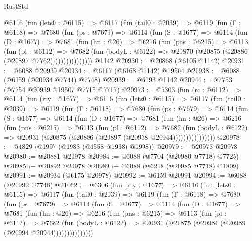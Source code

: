 \begin{lexlean}{RustStd}
\begin{coremodule}
        @6116
          (fun (lets0 : @6115) =>
          @6117
            (fun (tail0 : @2039) =>
            @6119
              (fun (Γ : @6118) =>
              @7680
                (fun (ps : @7679) =>
                @6114
                  (fun (S : @1677) =>
                  @6114
                    (fun (D : @1677) =>
                    @7681
                      (fun (hn : @26) =>
                      @6216
                        (fun (pns : @6215) =>
                        @6113
                          (fun (pl : @6112) =>
                          @7682
                            (fun (bodyL : @6122) =>
                            @20870 (@20875 (@20886 (@20897 @7762))))))))))))))))
    @1142
@20930 := @20868 (@6105 @1142)
@20931 := @6088 @20930
@20934 := @6167 (@6168 @1142) @19504
@20938 := @6088 (@6159 (@20934 @7744) @7748)
@20939 := @6193 @1142
@20944 := @7753 (@7754 @20939 @19507 @7715 @7717)
@20973 := @6303
    (fun (rc : @6112) =>
    @6114
      (fun (rty : @1677) =>
      @6116
        (fun (lets0 : @6115) =>
        @6117
          (fun (tail0 : @2039) =>
          @6119
            (fun (Γ : @6118) =>
            @7680
              (fun (ps : @7679) =>
              @6114
                (fun (S : @1677) =>
                @6114
                  (fun (D : @1677) =>
                  @7681
                    (fun (hn : @26) =>
                    @6216
                      (fun (pns : @6215) =>
                      @6113
                        (fun (pl : @6112) =>
                        @7682
                          (fun (bodyL : @6122) =>
                          @20931 (@20875 (@20886 (@20897 (@20938 @20944))))))))))))))))
@20978 := @4829 (@1997 (@1983 (@4558 @1938) @1998))
@20979 := @20973 @20978
@20980 := @20881 @20978
@20984 := @6088 (@7704 (@20980 @7718) @7725)
@20985 := @20892 @20978
@20989 := @6088 (@6218 (@20985 @7718) @1809)
@20991 := @20934 (@6175 @20978)
@20992 := @6159 @20991
@20994 := @6088 (@20992 @7748)
@21022 := @6306
    (fun (rty : @1677) =>
    @6116
      (fun (lets0 : @6115) =>
      @6117
        (fun (tail0 : @2039) =>
        @6119
          (fun (Γ : @6118) =>
          @7680
            (fun (ps : @7679) =>
            @6114
              (fun (S : @1677) =>
              @6114
                (fun (D : @1677) =>
                @7681
                  (fun (hn : @26) =>
                  @6216
                    (fun (pns : @6215) =>
                    @6113
                      (fun (pl : @6112) =>
                      @7682
                        (fun (bodyL : @6122) =>
                        @20931 (@20875 (@20984 (@20989 (@20994 @20944)))))))))))))))

\end{coremodule}
\end{lexlean}
